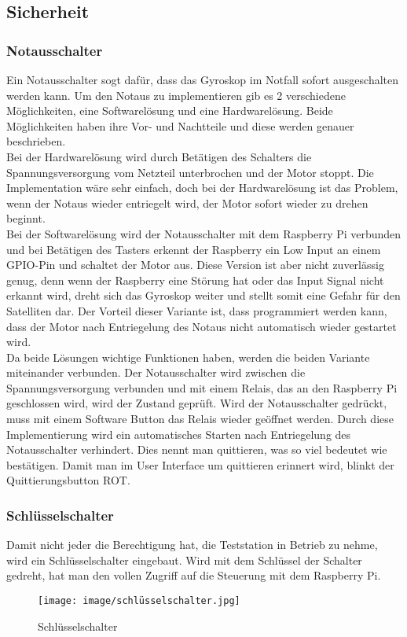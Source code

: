 \subsection{Sicherheit}\label{sec:sicherheit}

\subsubsection{Notausschalter}
Ein Notausschalter sogt dafür, dass das Gyroskop im Notfall sofort ausgeschalten werden kann. Um den Notaus zu implementieren gib es 2 verschiedene Möglichkeiten, eine Softwarelösung und eine Hardwarelösung. Beide Möglichkeiten haben ihre Vor- und Nachtteile und diese werden genauer beschrieben.\\
\vspace{3mm}
Bei der Hardwarelösung wird durch Betätigen des Schalters die Spannungsversorgung vom Netzteil unterbrochen und der Motor stoppt. Die Implementation wäre sehr einfach, doch bei der Hardwarelösung  ist das Problem, wenn der Notaus wieder entriegelt wird, der Motor sofort wieder zu drehen beginnt.\\
\vspace{3mm}
Bei der Softwarelösung wird der Notausschalter mit dem Raspberry Pi verbunden und bei Betätigen des Tasters erkennt der Raspberry ein Low Input an einem GPIO-Pin und schaltet der Motor aus. Diese Version ist aber nicht zuverlässig genug, denn wenn der Raspberry eine Störung hat oder das Input Signal nicht erkannt wird, dreht sich das Gyroskop weiter und stellt somit eine Gefahr für den Satelliten dar. Der Vorteil dieser Variante ist, dass programmiert werden kann, dass der Motor nach Entriegelung des Notaus nicht automatisch wieder gestartet wird.\\
\vspace{3mm}
Da beide Lösungen wichtige Funktionen haben, werden die beiden Variante miteinander verbunden. Der Notausschalter wird zwischen die Spannungsversorgung verbunden und mit einem Relais, das an den Raspberry Pi geschlossen wird, wird der Zustand geprüft. Wird der Notausschalter gedrückt, muss mit einem Software Button das Relais wieder geöffnet werden. Durch diese Implementierung wird ein automatisches Starten nach Entriegelung des Notausschalter verhindert. Dies nennt man quittieren, was so viel bedeutet wie bestätigen. Damit man im User Interface um quittieren erinnert wird, blinkt der Quittierungsbutton ROT. 
\pagebreak
\subsubsection{Schlüsselschalter}
Damit nicht jeder die Berechtigung hat, die Teststation in Betrieb zu nehme, wird ein Schlüsselschalter eingebaut. Wird mit dem Schlüssel der Schalter gedreht, hat man den vollen Zugriff auf die Steuerung mit dem Raspberry Pi. \\
\vspace{3mm}
\begin{figure}[H]
    \centering
    \texttt{[image: image/schlüsselschalter.jpg]}
    \caption{Schlüsselschalter}
    \label{fig:enter-label}
\end{figure}

